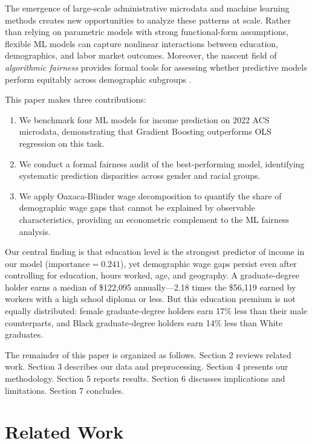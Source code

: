 \documentclass[11pt]{article}
\begin{document}
The emergence of large-scale administrative microdata and machine learning
methods creates new opportunities to analyze these patterns at scale. Rather
than relying on parametric models with strong functional-form assumptions,
flexible ML models can capture nonlinear interactions between education,
demographics, and labor market outcomes. Moreover, the nascent field of
\textit{algorithmic fairness} provides formal tools for assessing whether
predictive models perform equitably across demographic subgroups
\citep{ding2021retiring, barocas2019fairness}.

This paper makes three contributions:
\begin{enumerate}
    \item We benchmark four ML models for income prediction on 2022 ACS microdata,
    demonstrating that Gradient Boosting outperforms OLS regression on this task.
    \item We conduct a formal fairness audit of the best-performing model,
    identifying systematic prediction disparities across gender and racial groups.
    \item We apply Oaxaca-Blinder wage decomposition to quantify the share of
    demographic wage gaps that cannot be explained by observable characteristics,
    providing an econometric complement to the ML fairness analysis.
\end{enumerate}

Our central finding is that education level is the strongest predictor of income
in our model ($\text{importance} = 0.241$), yet demographic wage gaps persist
even after controlling for education, hours worked, age, and geography. A
graduate-degree holder earns a median of \$122,095 annually---2.18 times
the \$56,119 earned by workers with a high school diploma or less. But this
education premium is not equally distributed: female graduate-degree holders
earn 17\% less than their male counterparts, and Black graduate-degree holders
earn 14\% less than White graduates.

The remainder of this paper is organized as follows. Section 2 reviews related
work. Section 3 describes our data and preprocessing. Section 4 presents our
methodology. Section 5 reports results. Section 6 discusses implications and
limitations. Section 7 concludes.

\section{Related Work}
\end{document}
